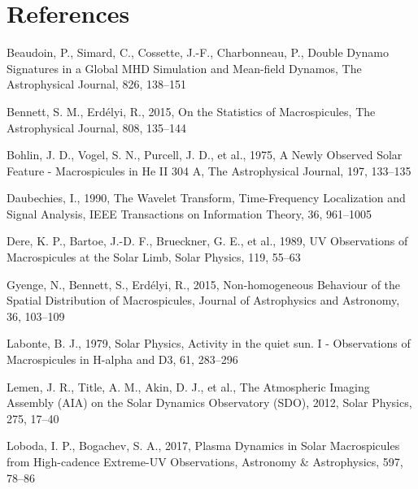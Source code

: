 \documentclass[final,authoryear,5p]{elsarticle}
\begin{document}
\section{References}
\begin{thebibliography}{99}
 Beaudoin, P., Simard, C., Cossette, J.-F., Charbonneau, P., Double Dynamo Signatures in a Global MHD Simulation and Mean-field Dynamos, The Astrophysical Journal, 826, 138--151

 Bennett, S. M., Erd\'{e}lyi, R., 2015, On the Statistics of Macrospicules, The Astrophysical Journal, 808, 135--144

  Bohlin, J. D., Vogel, S. N., Purcell, J. D., et al., 1975, A Newly Observed Solar Feature - Macrospicules in He II 304 A, The Astrophysical Journal, 197, 133--135

  Daubechies, I., 1990, The Wavelet Transform, Time-Frequency Localization and Signal Analysis, IEEE Transactions on Information Theory, 36, 961--1005

 Dere, K. P., Bartoe, J.-D. F., Brueckner, G. E., et al., 1989, UV Observations of Macrospicules at the Solar Limb, Solar Physics, 119, 55--63

 Gyenge, N., Bennett, S., Erd\'{e}lyi, R., 2015, Non-homogeneous Behaviour of the Spatial Distribution of Macrospicules, Journal of Astrophysics and Astronomy, 36, 103--109

 Labonte, B. J., 1979, Solar Physics, Activity in the quiet sun. I - Observations of Macrospicules in H-alpha and D3, 61, 283--296

 Lemen, J. R., Title, A. M., Akin, D. J., et al., The Atmospheric Imaging Assembly (AIA) on the Solar Dynamics Observatory (SDO), 2012, Solar Physics, 275, 17--40

 Loboda, I. P., Bogachev, S. A., 2017, Plasma Dynamics in Solar Macrospicules from High-cadence Extreme-UV Observations, Astronomy \& Astrophysics, 597, 78--86


\end{thebibliography}
\end{document}
